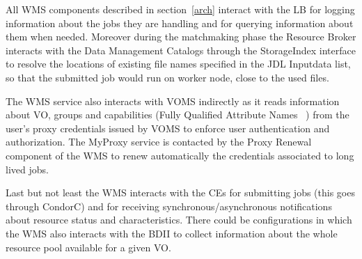 
All WMS components described in section~\ref{arch} interact with the LB for logging information about the 
jobs they are handling and for querying information about them when needed.
Moreover during the matchmaking phase the Resource Broker interacts with the Data Management Catalogs through 
the StorageIndex interface to resolve the locations of existing file names specified in the JDL Inputdata list, 
so that the submitted job would run on worker node, close to the used files.

The WMS service also interacts with VOMS indirectly as it reads information about VO, groups and capabilities 
(Fully Qualified Attribute Names ~\cite{voms-core}) from the user's proxy credentials issued by VOMS to enforce 
user authentication and authorization.
The MyProxy service is contacted by the Proxy Renewal component of the WMS to renew automatically the 
credentials associated to long lived jobs.

Last but not least the WMS interacts with the CEs for submitting jobs (this goes through CondorC) and for receiving 
synchronous/asynchronous notifications about resource status and characteristics.
There could be configurations in which the WMS also interacts with the BDII to collect information about the whole 
resource pool available for a given VO. 


